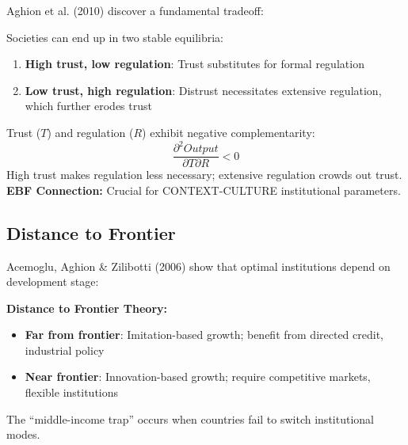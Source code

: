 Aghion et al. (2010) discover a fundamental tradeoff:

\begin{theorem}
Societies can end up in two stable equilibria:
\begin{enumerate}
    \item \textbf{High trust, low regulation}: Trust substitutes for formal regulation
    \item \textbf{Low trust, high regulation}: Distrust necessitates extensive regulation, which further erodes trust
\end{enumerate}
\end{theorem}

\begin{axiom}
\label{ax:pa5}
Trust ($T$) and regulation ($R$) exhibit negative complementarity:
\begin{equation}
\frac{\partial^2 Output}{\partial T \partial R} < 0
\end{equation}
High trust makes regulation less necessary; extensive regulation crowds out trust.
\textbf{EBF Connection:} Crucial for CONTEXT-CULTURE institutional parameters.
\end{axiom}

\subsection{Distance to Frontier}

Acemoglu, Aghion \& Zilibotti (2006) show that optimal institutions depend on development stage:

\begin{tcolorbox}[colback=green!5!white, colframe=green!75!black]
\textbf{Distance to Frontier Theory:}
\begin{itemize}
    \item \textbf{Far from frontier}: Imitation-based growth; benefit from directed credit, industrial policy
    \item \textbf{Near frontier}: Innovation-based growth; require competitive markets, flexible institutions
\end{itemize}
The ``middle-income trap'' occurs when countries fail to switch institutional modes.
\end{tcolorbox}

